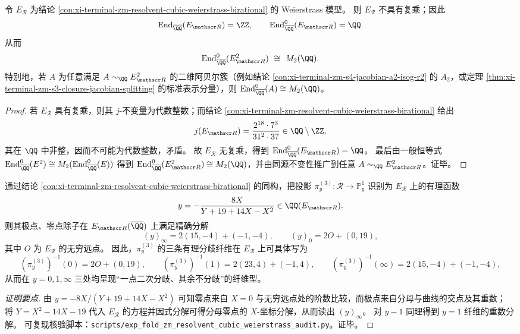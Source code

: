 \begin{proposition}[无复乘与几何端同态代数的极大性]\label{prop:xi-terminal-zm-resolvent-cubic-no-cm-max-end}
令 \(E_{\mathscr R}\) 为结论 \ref{con:xi-terminal-zm-resolvent-cubic-weierstrass-birational} 的 Weierstrass 模型。
则 \(E_{\mathscr R}\) 不具有复乘；因此
\[
\mathrm{End}_{\overline{\QQ}}(E_{\mathscr R})=\ZZ,
\qquad
\mathrm{End}^0_{\overline{\QQ}}(E_{\mathscr R})=\QQ.
\]
从而
\[
\mathrm{End}^0_{\overline{\QQ}}(E_{\mathscr R}^{2})\ \cong\ M_2(\QQ).
\]
特别地，若 \(A\) 为任意满足 \(A\sim_{\QQ}E_{\mathscr R}^{2}\) 的二维阿贝尔簇（例如结论 \ref{con:xi-terminal-zm-s4-jacobian-a2-isog-r2} 的 \(A_2\)，或定理 \ref{thm:xi-terminal-zm-s3-closure-jacobian-splitting} 的标准表示分量），则
\(
\mathrm{End}^0_{\overline{\QQ}}(A)\cong M_2(\QQ)
\)。
\end{proposition}
\begin{proof}
若 \(E_{\mathscr R}\) 具有复乘，则其 \(j\)-不变量为代数整数；而结论 \ref{con:xi-terminal-zm-resolvent-cubic-weierstrass-birational} 给出
\[
j(E_{\mathscr R})=\frac{2^{18}\cdot 7^{3}}{31^{2}\cdot 37}\in\QQ\setminus\ZZ,
\]
其在 \(\QQ\) 中非整，因而不可能为代数整数，矛盾。
故 \(E_{\mathscr R}\) 无复乘，得到 \(\mathrm{End}^0_{\overline{\QQ}}(E_{\mathscr R})=\QQ\)。
最后由一般恒等式
\(
\mathrm{End}^0_{\overline{\QQ}}(E^{2})\cong M_2(\mathrm{End}^0_{\overline{\QQ}}(E))
\)
得到 \(\mathrm{End}^0_{\overline{\QQ}}(E_{\mathscr R}^{2})\cong M_2(\QQ)\)，并由同源不变性推广到任意 \(A\sim_{\QQ}E_{\mathscr R}^{2}\)。证毕。
\end{proof}

\begin{conclusion}\label{con:xi-terminal-zm-resolvent-cubic-y-divisor-rational-fibers}
通过结论 \ref{con:xi-terminal-zm-resolvent-cubic-weierstrass-birational} 的同构，把投影
\(
\pi^{(3)}_y:\overline{\mathcal R}\to\mathbb P^1_y
\)
识别为 \(E_{\mathscr R}\) 上的有理函数
\[
y=-\frac{8X}{Y+19+14X-X^2}\in\QQ(E_{\mathscr R}).
\]
则其极点、零点除子在 \(E_{\mathscr R}(\overline{\QQ})\) 上满足精确分解
\[
(y)_\infty=2(15,-4)+(-1,-4),
\qquad
(y)_0=2O+(0,19),
\]
其中 \(O\) 为 \(E_{\mathscr R}\) 的无穷远点。
因此，\(\pi^{(3)}_y\) 的三条有理分歧纤维在 \(E_{\mathscr R}\) 上可具体写为
\[
(\pi^{(3)}_y)^{-1}(0)=2O+(0,19),
\qquad
(\pi^{(3)}_y)^{-1}(1)=2(23,4)+(-1,4),
\qquad
(\pi^{(3)}_y)^{-1}(\infty)=2(15,-4)+(-1,-4),
\]
从而在 \(y=0,1,\infty\) 三处均呈现“一点二次分歧、其余不分歧”的纤维型。
\end{conclusion}
\begin{proof}[证明要点]
由
\(
y=-8X/(Y+19+14X-X^2)
\)
可知零点来自 \(X=0\) 与无穷远点处的阶数比较，而极点来自分母与曲线的交点及其重数；
将 \(Y=X^2-14X-19\) 代入 \(E_{\mathscr R}\) 的方程并因式分解可得分母零点的 \(X\)-坐标分解，从而读出 \((y)_\infty\)。
对 \(y-1\) 同理得到 \(y=1\) 纤维的重数分解。
可复现核验脚本：\texttt{scripts/exp\_fold\_zm\_resolvent\_cubic\_weierstrass\_audit.py}。证毕。
\end{proof}

